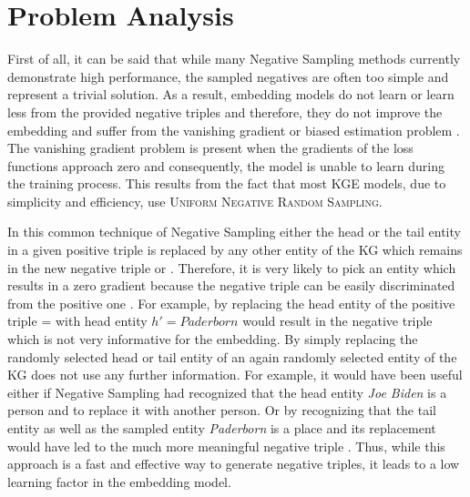 \section{Problem Analysis}
\label{sec:problem_analysis}

First of all, it can be said that while many Negative Sampling methods currently demonstrate high performance, the sampled negatives are often too simple and represent a trivial solution. 
As a result, embedding models do not learn or learn less from the provided negative triples and therefore, they do not improve the embedding and suffer from the vanishing gradient or biased estimation problem \cite{zhang2021efficient}.
The vanishing gradient problem is present when the gradients of the loss functions approach zero and consequently, the model is unable to learn during the training process.
This results from the fact that most \ac{KGE} models, due to simplicity and efficiency, use \textsc{Uniform Negative Random Sampling}.

In this common technique of Negative Sampling either the head or the tail entity in a given positive triple  is replaced by any other entity of the \ac{KG} which remains in the new negative triple  or . 
Therefore, it is very likely to pick an entity which results in a zero gradient because the negative triple can be easily discriminated from the positive one \cite{cai2017kbgan}.
For example, by replacing the head entity of the positive triple  =  with head entity $h' = Paderborn$ would result in the negative triple  which is not very informative for the embedding.
By simply replacing the randomly selected head or tail entity of an again randomly selected entity of the \ac{KG} does not use any further information.
For example, it would have been useful either if Negative Sampling had recognized that the head entity \textit{Joe Biden} is a person and to replace it with another person.
Or by recognizing that the tail entity as well as the sampled entity \textit{Paderborn} is a place and its replacement would have led to the much more meaningful negative triple .  
Thus, while this approach is a fast and effective way to generate negative triples, it leads to a low learning factor in the embedding model.

